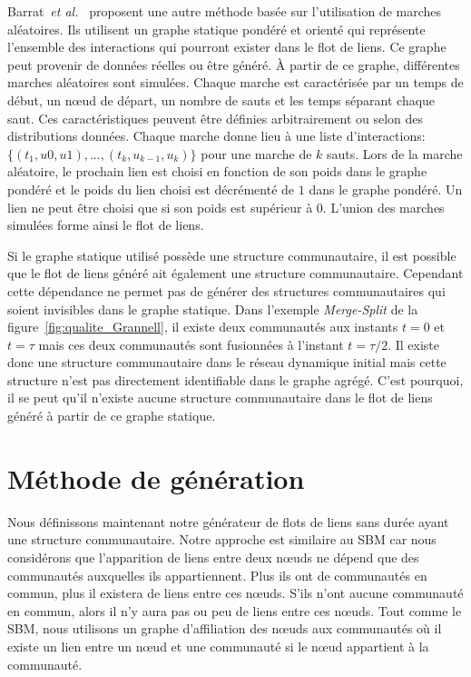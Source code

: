 Barrat~\emph{et al.}~\cite{Barrat2013a} proposent une autre méthode basée sur l'utilisation de marches aléatoires.
Ils utilisent un graphe statique pondéré et orienté qui représente l'ensemble des interactions qui pourront exister dans le flot de liens.
Ce graphe peut provenir de données réelles ou être généré.
\`A partir de ce graphe, différentes marches aléatoires sont simulées.
Chaque marche est caractérisée par un temps de début, un n\oe ud de départ, un nombre de sauts et les temps séparant chaque saut.
Ces caractéristiques peuvent être définies arbitrairement ou selon des distributions données.
Chaque marche donne lieu à une liste d'interactions: $\{(t_1,u0,u1), ..., (t_k,u_{k-1}, u_k)\}$ pour une marche de $k$ sauts.
Lors de la marche aléatoire, le prochain lien est choisi en fonction de son poids dans le graphe pondéré et le poids du lien choisi est décrémenté de $1$ dans le graphe pondéré.
Un lien ne peut être choisi que si son poids est supérieur à $0$.
L'union des marches simulées forme ainsi le flot de liens.


Si le graphe statique utilisé possède une structure communautaire, il est possible que le flot de liens généré ait également une structure communautaire.
Cependant cette dépendance ne permet pas de générer des structures communautaires qui soient invisibles dans le graphe statique.
Dans l'exemple \emph{Merge-Split} de la figure~\ref{fig:qualite_Grannell}, il existe deux communautés aux instants $t=0$ et $t=\tau$ mais ces deux communautés sont fusionnées à l'instant $t=\tau/2$.
Il existe donc une structure communautaire dans le réseau dynamique initial mais cette structure n'est pas directement identifiable dans le graphe agrégé.
C'est pourquoi, il se peut qu'il n'existe aucune structure communautaire dans le flot de liens généré à partir de ce graphe statique.



\section{Méthode de génération}
\label{sec:versqualite_methode}

Nous définissons maintenant notre générateur de flots de liens sans durée ayant une structure communautaire.
Notre approche est similaire au SBM car nous considérons que l'apparition de liens entre deux n\oe uds ne dépend que des communautés auxquelles ils appartiennent.
Plus ils ont de communautés en commun, plus il existera de liens entre ces n\oe uds.
S'ils n'ont aucune communauté en commun, alors il n'y aura pas ou peu de liens entre ces n\oe uds.
Tout comme le SBM, nous utilisons un graphe d'affiliation des n\oe uds aux communautés où il existe un lien entre un n\oe ud et une communauté si le n\oe ud appartient à la communauté.

